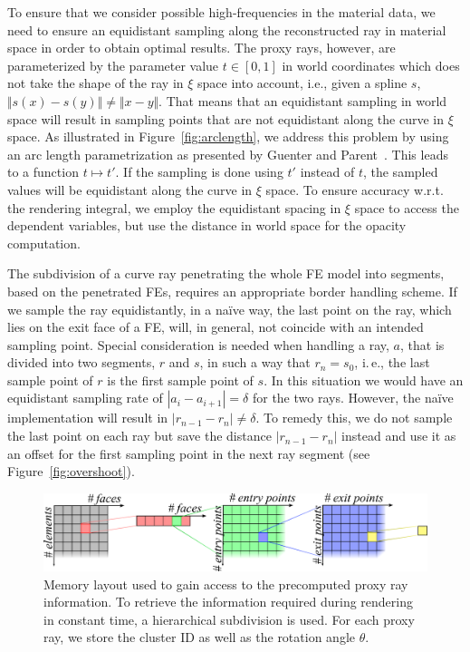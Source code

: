\documentclass[journal]{vgtc}                %
\begin{document}
To ensure that we consider possible high-frequencies in the material data, we need to ensure an equidistant sampling along the reconstructed ray in material space in order to obtain optimal results. The proxy rays, however, are parameterized by the parameter value $t \in [0,1]$ in world coordinates which does not take the shape of the ray in $\xi$ space into account, i.e., given a spline $s$, $\Vert s(x) - s(y) \Vert \neq \Vert x - y \Vert$. That means that an equidistant sampling in world space will result in sampling points that are not equidistant along the curve in $\xi$ space. As illustrated in Figure~\ref{fig:arclength}, we address this problem by using an arc length parametrization as presented by Guenter and Parent~\cite{guenter90arclength}. This leads to a function $t \mapsto t'$. If the sampling is done using $t'$ instead of $t$, the sampled values will be equidistant along the curve in $\xi$ space. To ensure accuracy w.r.t. the rendering integral, we employ the equidistant spacing in $\xi$ space to access the dependent variables, but use the distance in world space for the opacity computation.

The subdivision of a curve ray penetrating the whole FE model into segments, based on the penetrated FEs, requires an appropriate border handling scheme. If we sample the ray equidistantly, in a na\"ive way, the last point on the ray, which lies on the exit face of a FE, will, in general, not coincide with an intended sampling point. Special consideration is needed when handling a ray, $a$, that is divided into two segments, $r$ and $s$, in such a way that $r_n = s_0$, i.\,e., the last sample point of $r$ is the first sample point of $s$. In this situation we would have an equidistant sampling rate of $\left|a_i - a_{i+1}\right| = \delta$ for the two rays. However, the na\"ive implementation will result in $\left|r_{n-1} - r_{n}\right| \neq \delta$. To remedy this, we do not sample the last point on each ray but save the distance $\left|r_{n-1} - r_{n}\right|$ instead and use it as an offset for the first sampling point in the next ray segment (see Figure~\ref{fig:overshoot}).
%
%
%
\begin{figure}[t]
    \centering
    \includegraphics[width=0.75\linewidth]{figures/memory_layout.pdf}
    \caption{Memory layout used to gain access to the precomputed proxy ray information. To retrieve the information required during rendering in constant time, a hierarchical subdivision is used. For each proxy ray, we store the cluster ID as well as the rotation angle $\theta$.}
    \label{fig:memory_layout}
\end{figure}
%
%
%
\end{document}
